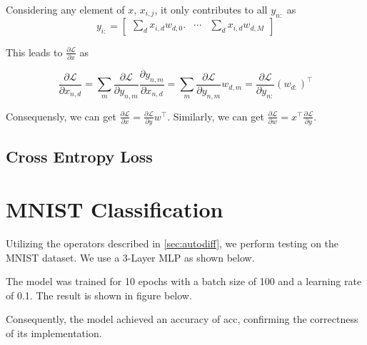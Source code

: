 \documentclass{lucas-report}
\begin{document}
Considering any element of \(x\), \(x_{i,j}\), it only contributes to all \(y_{n:}\) as
\[
  y_{i:} = 
  \begin{bmatrix}
       \sum_d x_{i,d} w_{d,0}. & \cdots & \sum_d x_{i,d} w_{d,M}
  \end{bmatrix}
\]

This leads to \(\frac{\partial \mathcal{L}}{\partial x}\) as

\[
  \frac{\partial \mathcal{L}}{\partial x_{n,d}} = 
  \sum_m \frac{\partial \mathcal{L} }{\partial y_{n,m}} \frac{\partial y_{n,m}}{\partial x_{n,d}} = 
  \sum_m \frac{\partial \mathcal{L} }{\partial y_{n,m}} w_{d,m} =
  \frac{\partial \mathcal{L} }{\partial y_{n:}} (w_{d:})^{\top}
\]

Consequensly, we can get \(\frac{\partial \mathcal{L}}{\partial x} = \frac{\partial \mathcal{L} }{\partial y} w^{\top}\).
Similarly, we can get \(\frac{\partial \mathcal{L}}{\partial w} = x^{\top} \frac{\partial \mathcal{L} }{\partial y}\).

\subsection{Cross Entropy Loss}


\section{MNIST Classification}

Utilizing the operators described in \autoref{sec:autodiff},
we perform testing on the MNIST dataset.
We use a 3-Layer MLP as shown below.


The model was trained for 10 epochs with a batch size of 100 and a learning rate of 0.1.
The result is shown in figure below.


Consequently, the model achieved an accuracy of {acc}, confirming the correctness of its implementation.



\printbibliography
\end{document}
